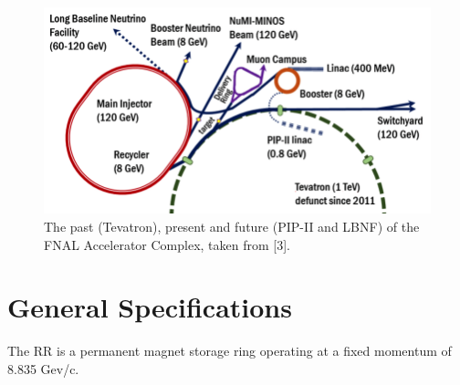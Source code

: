 \begin{figure}[]
   \centering
   \includegraphics[width=\columnwidth]{chapter2/FNAL.png}
   \caption{The past (Tevatron), present and future (PIP-II and LBNF) of the FNAL Accelerator Complex, taken from [3].}
   \label{fig:fnal}
\end{figure}

\section{General Specifications}

The RR is a permanent magnet storage ring operating at a fixed momentum of 8.835 Gev/c.
\cite{pipII1} \cite{rr2}

